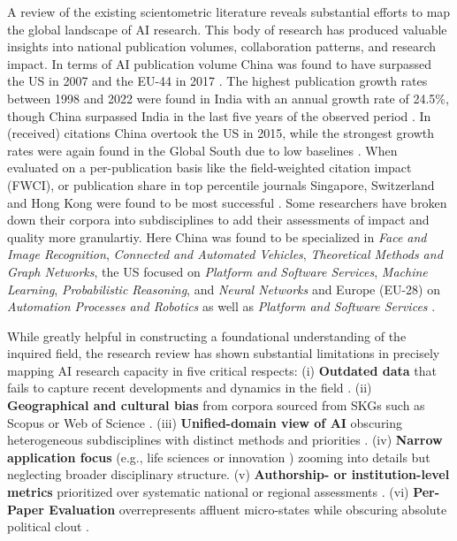 \documentclass{article}
\begin{document}
	A review of the existing scientometric literature reveals substantial efforts to map the global landscape of AI research. This body of research has produced valuable insights into national publication volumes, collaboration patterns, and research impact. In terms of AI publication volume China was found to have surpassed the US in 2007 \cite{almarzouqi2024comparative} and the EU-44 in 2017 \cite{hellwig2019ai}. The highest publication growth rates between 1998 and 2022 were found in India with an annual growth rate of 24.5\%, though China surpassed India in the last five years of the observed period \cite{almarzouqi2024comparative}. In (received) citations China overtook the US in 2015, while the strongest growth rates were again found in the Global South due to low baselines \cite{almarzouqi2024comparative}. When evaluated on a per-publication basis like the field-weighted citation impact (FWCI), or publication share in top percentile journals Singapore, Switzerland and Hong Kong were found to be most successful \cite{almarzouqi2024comparative}. Some researchers have broken down their corpora into subdisciplines to add their assessments of impact and quality more granulartiy. Here China was found to be specialized in \textit{Face and Image Recognition}, \textit{Connected and Automated Vehicles}, \textit{Theoretical Methods and Graph Networks}, the US focused on \textit{Platform and Software Services}, \textit{Machine Learning}, \textit{Probabilistic Reasoning}, and \textit{Neural Networks} and Europe (EU-28) on \textit{Automation Processes and Robotics} as well as \textit{Platform and Software Services} \cite{righi2020ai, yu2023discovering}.
	
	While greatly helpful in constructing a foundational understanding of the inquired field, the research review has shown substantial limitations in precisely mapping AI research capacity in five critical respects:  (i) \textbf{Outdated data} that fails to capture recent developments and dynamics in the field \cite{niu2016global}. (ii) \textbf{Geographical and cultural bias} from corpora sourced from SKGs such as Scopus or Web of Science \cite{almarzouqi2024comparative, ozkaya2023analysis, hellwig2019ai}. (iii) \textbf{Unified-domain view of AI} obscuring heterogeneous subdisciplines with distinct methods and priorities \cite{almarzouqi2024comparative, cao2020international, vinayak2023signatures, alshebli2022beijing, hu2020global}. (iv) \textbf{Narrow application focus} (e.g., life sciences \cite{schmallenbach2024global} or innovation \cite{mariani2023artificial}) zooming into details but neglecting broader disciplinary structure. (v) \textbf{Authorship- or institution-level metrics} prioritized over systematic national or regional assessments \cite{niu2016global, klinger2020narrowing}. (vi) \textbf{Per-Paper Evaluation} overrepresents affluent micro-states while obscuring absolute political clout \cite{righi2020ai}.
	
\end{document}
